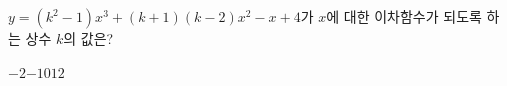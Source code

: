 $y=(k^2-1)x^3+(k+1)(k-2)x^2-x+4$가 $x$에 대한 이차함수가 되도록 하는 상수 $k$의 값은?
\begin{choices32}{$-2$}{$-1$}{$0$}{$1$}{$2$}\end{choices32}
